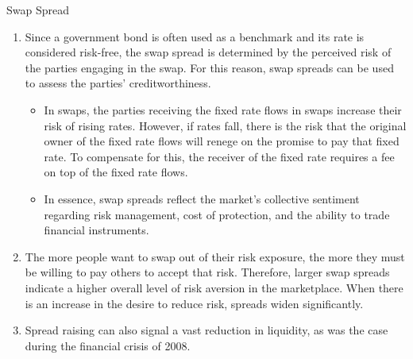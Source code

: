 \documentclass{beamer}
\begin{document}
\begin{frame}{Swap Spread}
\begin{enumerate}
	\item Since a government bond is often used as a benchmark and its rate is considered risk-free, the swap spread is determined by the perceived risk of the parties engaging in the swap. For this reason, swap spreads can be used to assess the parties' creditworthiness.
	\begin{itemize}
		\item In swaps, the parties receiving the fixed rate flows in swaps increase their risk of rising rates. However, if rates fall, there is the risk that the original owner of the fixed rate flows will renege on the promise to pay that fixed rate. To compensate for this, the receiver of the fixed rate requires a fee on top of the fixed rate flows.
		\item In essence, swap spreads reflect the market's collective sentiment regarding risk management, cost of protection, and the ability to trade financial instruments.
	\end{itemize}
	\item The more people want to swap out of their risk exposure, the more they must be willing to pay others to accept that risk. Therefore, larger swap spreads indicate a higher overall level of risk aversion in the marketplace. When there is an increase in the desire to reduce risk, spreads widen significantly.
	\item Spread raising can also signal a vast reduction in liquidity, as was the case during the financial crisis of 2008.
\end{enumerate}
\end{frame}

\end{document}
